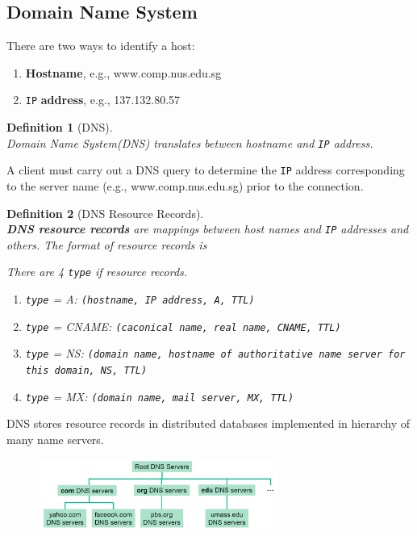 \documentclass[12pt]{article}
\newtheorem{definition}{Definition}[section]
\theoremstyle{definition}
\begin{document}
\subsection{Domain Name System}
There are two ways to identify a host:
\begin{enumerate}
  \item \textbf{Hostname}, e.g., www.comp.nus.edu.sg
  \item \texttt{IP} \textbf{address}, e.g., 137.132.80.57
\end{enumerate}
\begin{definition}[DNS]
\hfill\\\normalfont Domain Name System(DNS) translates between hostname and \texttt{IP} address.
\end{definition}
A client must carry out a DNS query to determine the \texttt{IP} address corresponding to the server name (e.g., www.comp.nus.edu.sg) prior to the connection.
\begin{definition}[DNS Resource Records]
\hfill\\\normalfont \textbf{DNS resource records} are mappings between host names and \texttt{IP} addresses and others.
The format of resource records is
\begin{center}
\end{center}
There are 4 \texttt{type} if resource records.
\begin{enumerate}
  \item \texttt{type} = A: \texttt{(hostname, IP address, A, TTL)}
  \item \texttt{type} = CNAME: \texttt{(caconical name, real name, CNAME, TTL)}
  \item \texttt{type} = NS: \texttt{(domain name, hostname of authoritative name server for this domain, NS, TTL)}
  \item \texttt{type} = MX: \texttt{(domain name, mail server, MX, TTL)}
\end{enumerate}
\end{definition}
DNS stores resource records in distributed databases implemented in hierarchy of many name servers.
\begin{figure}[h]
\centering
\includegraphics[width = 0.7\textwidth]{2_2_3.png}
\end{figure}
\end{document}
